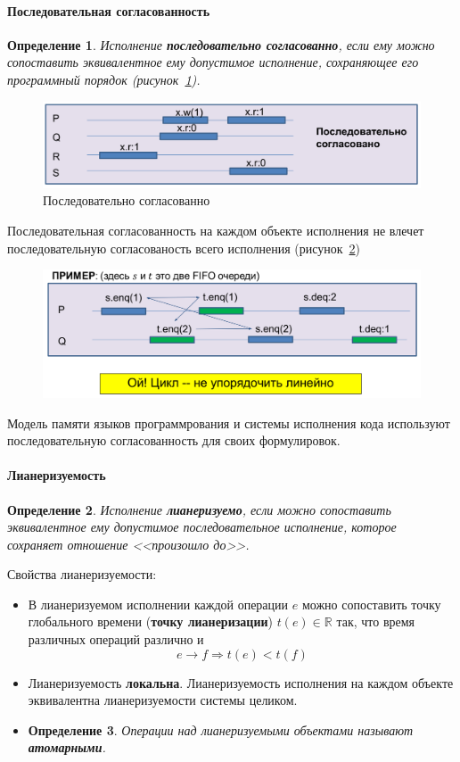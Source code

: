 \documentclass[10pt,a4paper,oneside,titlepage]{article}
\theoremstyle{plain}
\theoremstyle{defenition}
\newtheorem*{defenition}{Определение}
\begin{document}
\paragraph{Последовательная согласованность}
\begin{defenition}
	Исполнение {\bfseries последовательно согласованно}, если ему можно сопоставить эквивалентное ему допустимое исполнение, сохраняющее его программный порядок (рисунок~\ref{fig:model9}).
\end{defenition}

\begin{figure}[h!]
	\centering
	\includegraphics[width=0.5\linewidth]{pictures/Model9}
	\caption{Последовательно согласованно}
	\label{fig:model9}
\end{figure}

Последовательная согласованность на каждом объекте исполнения не влечет последовательную согласованость всего исполнения (рисунок~\ref{fig:model10})

\begin{figure}[h!]
	\centering
	\includegraphics[width=0.7\linewidth]{pictures/Model10}
	\caption{}
	\label{fig:model10}
\end{figure}

Модель памяти языков программрования и системы исполнения кода используют последовательную согласованность для своих формулировок.

\paragraph{Лианеризуемость}
\begin{defenition}
	Исполнение {\bfseries лианеризуемо}, если можно сопоставить эквивалентное ему допустимое последовательное исполнение, которое сохраняет отношение <<произошло до>>. 
\end{defenition}

Свойства лианеризуемости:
\begin{itemize}
	\item В лианеризуемом исполнении каждой операции $e$ можно сопоставить точку глобального времени ({\bfseries точку лианеризации}) $t(e)\in\mathbb{R}$ так, что время различных операций различно и
	$$
	e\to f\Rightarrow t(e)<t(f)
	$$
	\item Лианеризуемость {\bfseries локальна}. Лианеризуемость исполнения на каждом объекте эквивалентна лианеризуемости системы целиком.
	\item \begin{defenition}
		Операции над лианеризуемыми объектами называют {\bfseries атомарными}.
	\end{defenition}
\end{itemize}
\end{document}
